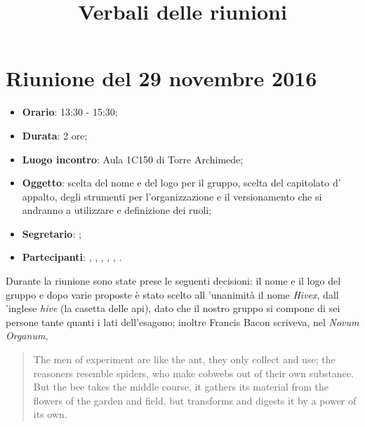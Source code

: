 


\author{\PB}
\supervisor{\GG}
\title{Verbali delle riunioni}



\maketitle



\section{Riunione del 29 novembre 2016}

\begin{itemize}
	\item \textbf{Orario}: 13:30 - 15:30;
	\item \textbf{Durata}: 2 ore;
	\item \textbf{Luogo incontro}: Aula 1C150 di Torre Archimede; 
	\item \textbf{Oggetto}: scelta del nome e del logo per il gruppo, scelta del capitolato d' appalto, degli strumenti per l'organizzazione e il versionamento che si andranno a utilizzare e definizione dei ruoli;
	\item \textbf{Segretario}: \LB; 
	\item \textbf{Partecipanti}: \AZ, \GG, \LB, \LS, \MM, \PB.
\end{itemize}

Durante la riunione sono state prese le seguenti decisioni:
il nome e il logo del gruppo e dopo varie proposte è stato scelto all 'unanimità il nome \textit{Hivex}, dall 'inglese \textit{hive} (la casetta delle api), dato che il nostro gruppo si compone di sei persone tante quanti i lati dell'esagono; inoltre Francis Bacon scriveva, nel \textit{Novum Organum},
\begin{quote}
	The men of experiment are like the ant, they only collect and use; the reasoners resemble spiders, who make cobwebs out of their own substance. But the bee takes the middle course, it gathers its material from the flowers of the garden and field, but transforms and digests it by a power of its own.
\end{quote}

